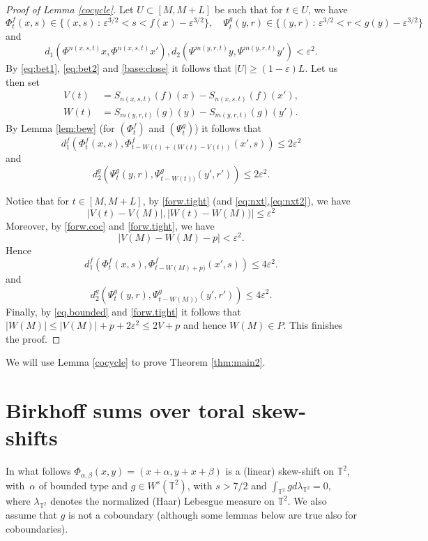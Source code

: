 \documentclass[JEP,XML,SOM,Unicode,NoEqCountersInSection]{cedram}
\let\epsilon\varepsilon
\newcommand{\sep}{\,:\,}
\theoremstyle{definition}
\theoremstyle{plain}
\newcommand\TT{\mathbb{T}}
\begin{document}
\begin{proof}[Proof of Lemma \ref{cocycle}]
Let $U\subset [M,M+L]$ be such that for $t\in U$, we have
\[
\Phi_t^f(x,s)\in \{(x,s)\sep\epsilon^{3/2}\!<\!s\!<\!f(x)-\epsilon^{3/2}\}, \quad\Psi_t^g(y,r)\in \{(y,r)\sep\epsilon^{3/2}\!<\!r\!<\!g(y)-\epsilon^{3/2}\}
\]
and
\begin{equation*}%
d_1(\Phi^{n(x,s,t)}x,\Phi^{n(x,s,t)}x'),
d_2(\Psi^{m(y,r,t)}y,\Psi^{m(y,r,t)} y')<\epsilon^2.
\end{equation*}
By \eqref{eq:bet1}, \eqref{eq:bet2} and \eqref{base:close} it follows that $|U|\geq (1-\epsilon)L$. Let us then set
\[
\begin{aligned}
V(t)&=S_{n(x,s,t)}(f)(x)-S_{n(x,s,t)}(f)(x'),\\ W(t)&=S_{m(y,r,t)}(g)(y)-S_{m(y,r,t)}(g)(y').
\end{aligned}
\]
By Lemma \ref{lem:bew} (for $(\Phi_t^f)$ and $(\Psi_t^g)$) it follows that
\[
d_1^f(\Phi_t^f(x,s),\Phi_{t-W(t)+(W(t)-V(t))}^f(x',s))\leq 2\epsilon^2
\]
and
\[
d_2^g(\Psi_t^g(y,r),\Psi_{t-W(t))}^g(y',r'))\leq 2\epsilon^2.
\]

Notice that for $t\in [M,M+L]$, by \eqref{forw.tight} (and \eqref{eq:nxt},\eqref{eq:nxt2}), we have
\begin{equation*}%
|V(t)-V(M)|,|W(t)-W(M))|\leq \epsilon^2
\end{equation*}
Moreover, by \eqref{forw.coc} and \eqref{forw.tight}, we have
\begin{equation*}%
|V(M)-W(M)-p|<\epsilon^2.
\end{equation*}
Hence
\[
d_1^f(\Phi_t^f(x,s),\Phi_{t-W(M)+p)}^f(x',s))\leq 4\epsilon^2.
\]
and
\[
d_2^g(\Psi_t^g(y,r),\Psi_{t-W(M))}^g(y',r'))\leq 4\epsilon^2.
\]
Finally, by \eqref{eq.bounded} and \eqref{forw.tight} it follows that $|W(M)|\leq
|V(M)|+p+2\epsilon^2\leq 2V+p$ and hence $W(M)\in P$. This finishes the proof.
\end{proof}

We will use Lemma \ref{cocycle} to prove Theorem \ref{thm:main2}.

\section{Birkhoff sums over toral skew-shifts}\label{sec:birksums}
In what follows $\Phi_{\alpha,\beta}(x,y)=(x+\alpha, y+x+\beta)$ is a (linear) skew-shift on $\TT^2$, with~$\alpha$ of bounded type and $g\in W^s(\TT^2)$, with $s>7/2$ and
$\int_{\TT^2} g d \lambda_{\TT^2} =0$, where $\lambda_{\TT^2}$ denotes the normalized (Haar) Lebesgue measure on $\TT^2$. We also assume that $g$ is not a coboundary (although some lemmas below are true also for coboundaries).
\end{document}
